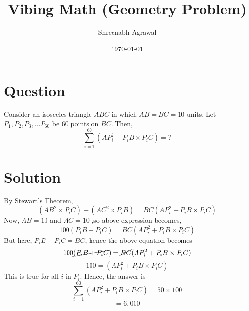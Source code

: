 \documentclass{article}
\title{Vibing Math (Geometry Problem)}
\author{Shreenabh Agrawal }
\date{\today}
\begin{document}
\maketitle

\section{Question}
Consider an isosceles triangle $ABC$ in which $AB = BC = 10$ units. Let $P_1, P_2, P_3, ... P_{60}$ be $60$ points on $BC$. Then, $$\sum_{i=1}^{60} (AP_i^2 + P_iB\times P_iC) = ?$$	

\section{Solution}
By Stewart's Theorem, 
$$(AB^2\times P_iC) + (AC^2\times P_iB) = BC ( AP_i^2 + P_iB\times P_iC)$$
Now, $AB = 10$ and $AC = 10$ ,so above expression becomes, 
$$100 (P_iB + P_iC) = BC (AP_i^2 + P_iB\times P_iC )$$
But here, $P_iB + P_iC = BC$, hence the above equation becomes
$$100 \cancel{(P_iB + P_iC)} = \cancel{BC} (AP_i^2 + P_iB\times P_iC )$$
$$100 = (AP_i^2 + P_iB \times P_iC)$$
This is true for all $i$ in $P_i$. Hence, the answer is
$$\sum_{i=1}^{60} (AP_i^2 + P_iB\times P_iC) = 60 \times 100$$
$$\boxed{= 6,000}$$
\end{document}
